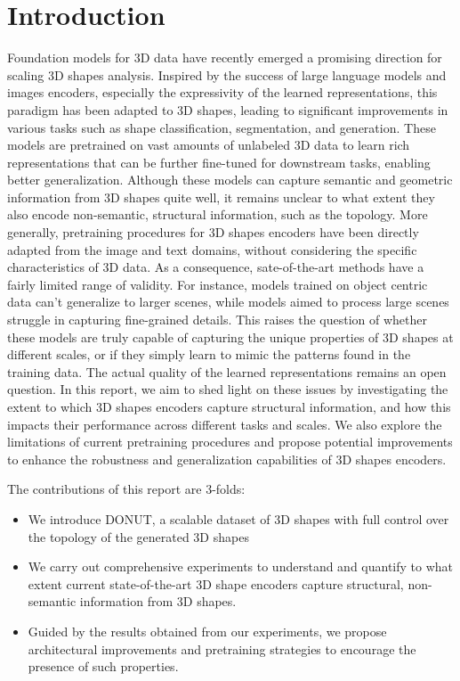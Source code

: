 \section{Introduction}
\label{sec:intro}


Foundation models for 3D data have recently emerged a promising direction for scaling 3D shapes analysis. Inspired by the success of large language models and images encoders, especially the expressivity of the learned representations, this paradigm has been adapted to 3D shapes, leading to significant improvements in various tasks such as shape classification, segmentation, and generation. These models are pretrained on vast amounts of unlabeled 3D data to learn rich representations that can be further fine-tuned for downstream tasks, enabling better generalization. Although these models can capture semantic and geometric information from 3D shapes quite well, it remains unclear to what extent they also encode non-semantic, structural information, such as the topology. More generally, pretraining procedures for 3D shapes encoders have been directly adapted from the image and text domains, without considering the specific characteristics of 3D data. As a consequence, sate-of-the-art methods have a fairly limited range of validity. For instance, models trained on object centric data can't generalize to larger scenes, while models aimed to process large scenes struggle in capturing fine-grained details. This raises the question of whether these models are truly capable of capturing the unique properties of 3D shapes at different scales, or if they simply learn to mimic the patterns found in the training data. The actual quality of the learned representations remains an open question. In this report, we aim to shed light on these issues by investigating the extent to which 3D shapes encoders capture structural information, and how this impacts their performance across different tasks and scales. We also explore the limitations of current pretraining procedures and propose potential improvements to enhance the robustness and generalization capabilities of 3D shapes encoders. 

The contributions of this report are 3-folds:

\begin{itemize}
    \item We introduce DONUT, a scalable dataset of 3D shapes with full control over the topology of the generated 3D shapes
    \item We carry out comprehensive experiments to understand and quantify to what extent current state-of-the-art 3D shape encoders capture structural, non-semantic information from 3D shapes.
    \item Guided by the results obtained from our experiments, we propose architectural improvements and pretraining strategies to encourage the presence of such properties.
\end{itemize}